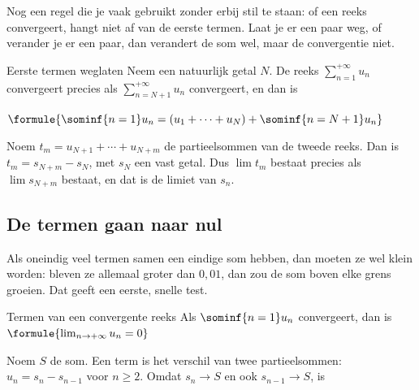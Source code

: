 Nog een regel die je vaak gebruikt zonder erbij stil te staan: of een reeks convergeert, hangt niet af van de eerste termen. Laat je er een paar weg, of verander je er een paar, dan verandert de som wel, maar de convergentie niet.

\begin{theorie}
\begin{stelling}{Eerste termen weglaten}
Neem een natuurlijk getal $N$. De reeks $\sum_{n=1}^{+\infty} u_n$ convergeert precies als $\sum_{n=N+1}^{+\infty} u_n$ convergeert, en dan is

\vspace{1mm}
\qquad $\formule{\sominf{n=1} u_n = (u_1 + \cdots + u_N) + \sominf{n=N+1} u_n}$
\end{stelling}

\begin{bewijs}
Noem $t_m = u_{N+1} + \cdots + u_{N+m}$ de partieelsommen van de tweede reeks. Dan is $t_m = s_{N+m} - s_N$, met $s_N$ een vast getal. Dus $\lim t_m$ bestaat precies als $\lim s_{N+m}$ bestaat, en dat is de limiet van $s_n$.
\end{bewijs}
\end{theorie}


\begin{oefeningen}
\end{oefeningen}

\subsection{De termen gaan naar nul}

Als oneindig veel termen samen een eindige som hebben, dan moeten ze wel klein worden: bleven ze allemaal groter dan $0{,}01$, dan zou de som boven elke grens groeien. Dat geeft een eerste, snelle test.

\begin{theorie}
\begin{stelling}{Termen van een convergente reeks}
Als $\sominf{n=1} u_n$ convergeert, dan is \quad $\formule{\lim_{n\to+\infty} u_n = 0}$
\end{stelling}

\begin{bewijs}
Noem $S$ de som. Een term is het verschil van twee partieelsommen: $u_n = s_n - s_{n-1}$ voor $n \geqslant 2$. Omdat $s_n \to S$ en ook $s_{n-1} \to S$, is
\end{bewijs}
\end{theorie}


